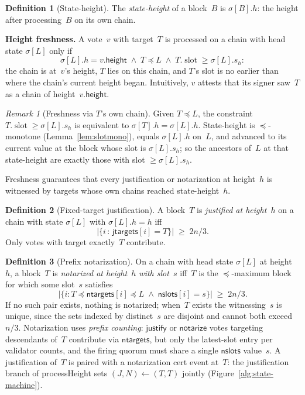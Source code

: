 \documentclass{article}
\newcommand{\slot}[0]{\ensuremath{\operatorname{\mathrm{slot}}}}
\newcommand{\height}{\mathsf{height}}
\newcommand{\just}{\ensuremath{\mathsf{justify}}\xspace}
\newcommand{\notar}{\ensuremath{\mathsf{notarize}}\xspace}
\newcommand{\jtargets}{\mathsf{jtargets}}
\newcommand{\ntargets}{\mathsf{ntargets}}
\newcommand{\nslots}{\mathsf{nslots}}
\newcommand{\processHeight}{\textsf{processHeight}\xspace}
\renewcommand{\paragraph}[1]{\vspace{7pt}\noindent\textbf{#1}}
\theoremstyle{plain}
\theoremstyle{definition}
\newtheorem{definition}{Definition}
\theoremstyle{remark}
\newtheorem{remark}{Remark}
\begin{document}
\begin{definition}[State-height]\label{def:sheight}
The \emph{state-height} of a block~$B$ is $\sigma[B].h$: the height after processing~$B$ on its own chain.
\end{definition}

\paragraph{Height freshness.}
A vote~$v$ with target~$T$ is processed on a chain with head state $\sigma[L]$ only if
\[
  \sigma[L].h = v.\height \;\wedge\; T \preceq L \;\wedge\; T.\slot \geq \sigma[L].s_h:
\]
the chain is at~$v$'s height, $T$ lies on this chain, and $T$'s slot is no earlier than where the chain's current height began.
Intuitively, $v$ attests that its signer saw~$T$ as a chain of height~$v.\height$.

\begin{remark}[Freshness via $T$'s own chain]\label{rem:fresh-equiv}
Given $T \preceq L$, the constraint $T.\slot \geq \sigma[L].s_h$ is equivalent to $\sigma[T].h = \sigma[L].h$.
State-height is $\preceq$-monotone (Lemma~\ref{lem:slotmono}), equals $\sigma[L].h$ on~$L$, and advanced to its current value at the block whose slot is $\sigma[L].s_h$; so the ancestors of~$L$ at that state-height are exactly those with slot $\geq \sigma[L].s_h$.
\end{remark}

Freshness guarantees that every justification or notarization at height~$h$ is witnessed by targets whose own chains reached state-height~$h$.

\begin{definition}[Fixed-target justification]\label{def:justification}
A block~$T$ is \emph{justified at height~$h$} on a chain with state $\sigma[L]$ with $\sigma[L].h = h$ iff
\[
  \bigl|\{i \,:\, \jtargets[i] = T\}\bigr| \;\geq\; 2n/3.
\]
Only votes with target exactly~$T$ contribute.
\end{definition}

\begin{definition}[Prefix notarization]\label{def:notarization}
On a chain with head state $\sigma[L]$ at height~$h$, a block~$T$ is \emph{notarized at height~$h$ with slot~$s$} iff~$T$ is the $\preceq$-maximum block for which some slot~$s$ satisfies
\[
  \bigl|\{i : T \preceq \ntargets[i] \preceq L \;\wedge\; \nslots[i] = s\}\bigr| \;\geq\; 2n/3.
\]
If no such pair exists, nothing is notarized; when~$T$ exists the witnessing~$s$ is unique, since the sets indexed by distinct~$s$ are disjoint and cannot both exceed~$n/3$.
Notarization uses \emph{prefix counting}: \just or \notar votes targeting descendants of~$T$ contribute via $\ntargets$, but only the latest-slot entry per validator counts, and the firing quorum must share a single $\nslots$ value~$s$.
A justification of~$T$ is paired with a notarization cert event at~$T$: the justification branch of \processHeight sets $(J, N) \gets (T, T)$ jointly (Figure~\ref{alg:state-machine}).
\end{definition}
\end{document}
